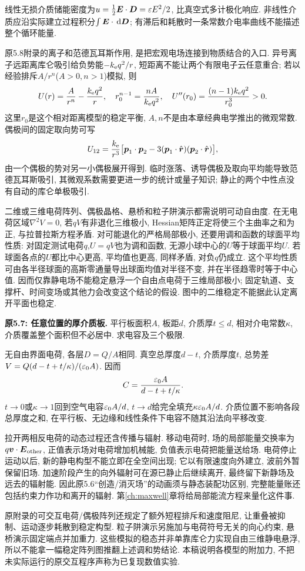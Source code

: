 线性无损介质储能密度为$u=\tfrac12\boldsymbol{E}\cdot\boldsymbol{D}=\varepsilon E^2/2$, 比真空式多计极化响应. 非线性介质应沿实际建立过程积分$\int\boldsymbol{E}\cdot\,\mathrm d\boldsymbol{D}$; 有滞后和耗散时一条常数介电率曲线不能描述整个循环能量.

\label{tb:atomic-forces}
原5.8附录的离子和范德瓦耳斯作用, 是把宏观电场连接到物质结合的入口. 异号离子远距离库仑吸引给负势能$-k_{\mathrm e} q^2/r$, 短距离不能让两个有限电子云任意重合; 若以经验排斥$A/r^n$($A>0,n>1$)模拟, 则
\[U(r)=\frac A{r^n}-\frac{k_{\mathrm e} q^2}r,\quad
r_0^{n-1}=\frac{nA}{k_{\mathrm e} q^2},\quad U''(r_0)=\frac{(n-1)k_{\mathrm e} q^2}{r_0^3}>0.\]
这里$r_0$是这个相对距离模型的稳定平衡, $A,n$不是由本章经典电学推出的微观常数. 偶极间的固定取向势可写
\[U_{12}=\frac{k_{\mathrm e}}{r^3}\big[\boldsymbol{p}_1\cdot\boldsymbol{p}_2-3(\boldsymbol{p}_1\cdot\hat{\boldsymbol{r}})(\boldsymbol{p}_2\cdot\hat{\boldsymbol{r}})\big],\]
由一个偶极的势对另一小偶极展开得到. 临时涨落、诱导偶极及取向平均能导致范德瓦耳斯吸引, 其微观系数需要更进一步的统计或量子知识; 静止的两个中性点没有自动的库仑单极吸引.

二维或三维电荷阵列、偶极晶格、悬桥和粒子阱演示都需说明可动自由度. 在无电荷区域$\nabla^2V=0$, 若$qV$有非退化三维极小, Hessian矩阵正定将使三个主曲率之和为正, 与拉普拉斯方程矛盾. 对可能退化的严格局部极小, 还要用调和函数的球面平均性质: 对固定测试电荷$q$,$U=qV$也为调和函数, 无源小球中心的$U$等于球面平均$U$. 若球面各点的$U$都比中心更高, 平均值也更高, 同样矛盾, 对负$q$仍成立. 这个平均性质可由各半径球面的高斯零通量导出球面均值对半径不变, 并在半径趋零时等于中心值. 因而仅靠静电场不能稳定悬浮一个自由点电荷于三维局部极小; 固定轨道、支撑杆、时间变场或其他力会改变这个结论的假设. 图中的二维稳定不能据此认定离开平面也稳定.

\begin{example}
\textbf{原5.7: 任意位置的厚介质板.} 平行板面积$A$, 板距$d$, 介质厚$t\le d$, 相对介电常数$\kappa$, 介质覆盖整个面积但不必居中. 求电容及三个极限.
\end{example}
\begin{solution}
无自由界面电荷, 各层$D=Q/A$相同. 真空总厚度$d-t$, 介质厚度$t$, 总势差$V=Q(d-t+t/\kappa)/(\varepsilon_0 A)$. 因而
\[C=\frac{\varepsilon_0 A}{d-t+t/\kappa}.\]
$t\to0$或$\kappa\to1$回到空气电容$\varepsilon_0 A/d$, $t\to d$给完全填充$\kappa\varepsilon_0 A/d$. 介质位置不影响各段总厚度之和, 在平行板、无边缘和线性条件下电容不随其沿法向平移改变.
\end{solution}

拉开两相反电荷的动态过程还含传播与辐射. 移动电荷时, 场的局部能量交换率为$q\boldsymbol{v}\cdot\boldsymbol{E}_{\rm other}$, 正值表示场对电荷增加机械能, 负值表示电荷把能量送给场. 电荷停止运动以后, 新的静电构型不能立即在全空间出现; 它以有限速度向外建立, 波前外暂保留旧场. 加速阶段产生的向外辐射可在源已静止后继续离开, 最终留下新静场及远去的辐射能. 因此原5.6“创造/消灭场”的动画须与静态装配功区别, 完整能量账还包括约束力作功和离开的辐射. 第\ref{ch:maxwell}章将给局部能流方程来量化这件事.

原附录的可交互电荷/偶极阵列还规定了额外短程排斥和速度阻尼, 让重叠被抑制、运动逐步耗散到稳定构型. 粒子阱演示另施加与电荷符号无关的向心约束, 悬桥演示固定端点并加重力. 这些模拟的稳态并非单靠库仑力实现自由三维静电悬浮, 所以不能拿一幅稳定阵列图推翻上述调和势结论. 本稿说明各模型的附加力, 不把未实际运行的原交互程序声称为已复现数值实验.
